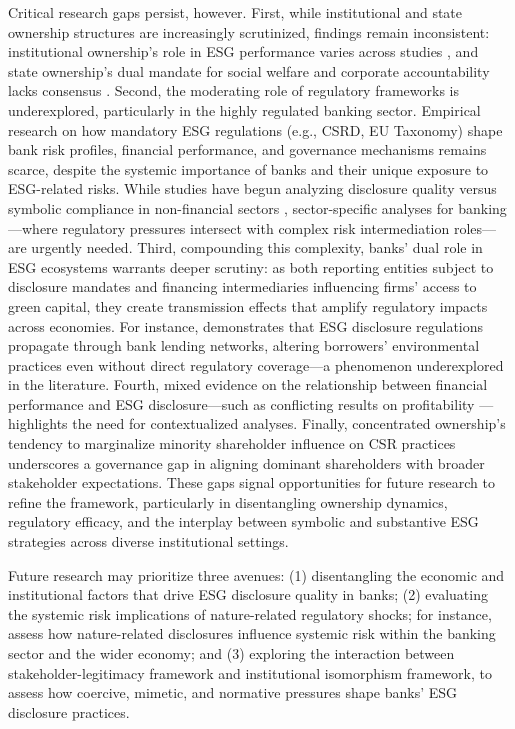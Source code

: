 \documentclass[
  authoryear]{elsarticle}
\begin{document}
Critical research gaps persist, however. First, while institutional and
state ownership structures are increasingly scrutinized, findings remain
inconsistent: institutional ownership's role in ESG performance varies
across studies \citep[e.g.,][]{DYCK2019, ALUCHNA2022}, and state
ownership's dual mandate for social welfare and corporate accountability
lacks consensus \citep{TAGESSON2009, RAIMO2020}. Second, the moderating
role of regulatory frameworks is underexplored, particularly in the
highly regulated banking sector. Empirical research on how mandatory ESG
regulations (e.g., CSRD, EU Taxonomy) shape bank risk profiles,
financial performance, and governance mechanisms remains scarce, despite
the systemic importance of banks and their unique exposure to
ESG-related risks. While studies have begun analyzing disclosure quality
versus symbolic compliance in non-financial sectors
\citep{CICCHIELLO2023, MANOS2024}, sector-specific analyses for
banking---where regulatory pressures intersect with complex risk
intermediation roles---are urgently needed. Third, compounding this
complexity, banks' dual role in ESG ecosystems warrants deeper scrutiny:
as both reporting entities subject to disclosure mandates and financing
intermediaries influencing firms' access to green capital, they create
transmission effects that amplify regulatory impacts across economies.
For instance, \citet{WANG2023} demonstrates that ESG disclosure
regulations propagate through bank lending networks, altering borrowers'
environmental practices even without direct regulatory coverage---a
phenomenon underexplored in the literature. Fourth, mixed evidence on
the relationship between financial performance and ESG disclosure---such
as conflicting results on profitability
\citep{HADDOCK2005, DYDUCH2017}---highlights the need for contextualized
analyses. Finally, concentrated ownership's tendency to marginalize
minority shareholder influence on CSR practices
\citep{SMITH2022, BORGES2024} underscores a governance gap in aligning
dominant shareholders with broader stakeholder expectations. These gaps
signal opportunities for future research to refine the framework,
particularly in disentangling ownership dynamics, regulatory efficacy,
and the interplay between symbolic and substantive ESG strategies across
diverse institutional settings.

Future research may prioritize three avenues: (1) disentangling the
economic and institutional factors that drive ESG disclosure quality in
banks; (2) evaluating the systemic risk implications of nature-related
regulatory shocks; for instance, assess how nature-related disclosures
influence systemic risk within the banking sector and the wider economy;
and (3) exploring the interaction between stakeholder-legitimacy
framework and institutional isomorphism framework, to assess how
coercive, mimetic, and normative pressures shape banks' ESG disclosure
practices.
\end{document}
